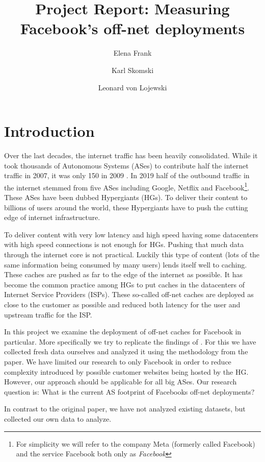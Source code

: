 \documentclass[sigconf,10pt,nonacm]{acmart}
\title{Project Report: Measuring Facebook's off-net deployments}
\author{Elena Frank}
\author{Karl Skomski}
\author{Leonard von Lojewski}
\begin{document}
\maketitle

\section{Introduction}

Over the last decades, the internet traffic has been heavily consolidated. While it took thousands of Autonomous Systems (ASes) to contribute half the internet traffic in 2007, it was only 150 in 2009 \cite{labovitz_internet_2019}. In 2019 half of the outbound traffic in the internet stemmed from five ASes including Google, Netflix and Facebook\footnote{For simplicity we will refer to the company Meta (formerly called Facebook) and the service Facebook both only as \textit{Facebook}}. These ASes have been dubbed Hypergiants (HGs). To deliver their content to billions of users around the world, these Hypergiants have to push the cutting edge of internet infrastructure.

To deliver content with very low latency and high speed having some datacenters with high speed connections is not enough for HGs. Pushing that much data through the internet core is not practical. Luckily this type of content (lots of the same information being consumed by many users) lends itself well to caching. These caches are pushed as far to the edge of the internet as possible. It has become the common practice among HGs to put caches in the datacenters of Internet Service Providers (ISPs). These so-called off-net caches are deployed as close to the customer as possible and reduced both latency for the user and upstream traffic for the ISP.

In this project we examine the deployment of off-net caches for Facebook in particular. More specifically we try to replicate the findings of \cite{gigis_seven_2021}. For this we have collected fresh data ourselves and analyzed it using the methodology from the paper. We have limited our research to only Facebook in order to reduce complexity introduced by possible customer websites being hosted by the HG. However, our approach should be applicable for all big ASes. Our research question is: What is the current AS footprint of Facebooks off-net deployments?

In contrast to the original paper, we have not analyzed existing datasets, but collected our own data to analyze.
\end{document}
